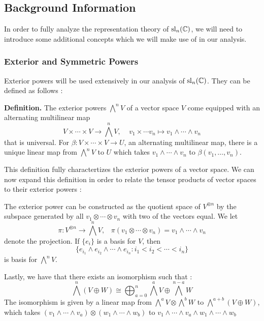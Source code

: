 \documentclass[11pt, a4paper, oneside]{article}
\theoremstyle{plain}
\theoremstyle{definition}
\theoremstyle{example}
\begin{document}
\subsection{Background Information}

In order to fully analyze the representation theory of $\mathrm{sl}_n(\mathbb{C})$, we will need to introduce some additional concepts which we will make use of in our analysis.

\subsubsection{Exterior and Symmetric Powers}

Exterior powers will be used extensively in our analysis of $\mathrm{sl}_n(\mathbb{C})$. They can be defined as follows \cite[\S B.2]{fulton}:

\par
\textbf{Definition.} The exterior powers $\bigwedge^n V$ of a vector space $V$ come equipped with an alternating multilinear map $$V \times \cdots \times V \to \bigwedge^nV, \; \; \; \; v_1 \times \cdots v_n \mapsto v_1 \wedge \cdots \wedge v_n$$ that is universal. For $\beta: V \times \cdots \times V \to U$, an alternating multilinear map, there is a unique linear map from $\bigwedge^n V$ to $U$ which takes $v_1 \wedge \cdots \wedge v_n$ to $\beta(v_1 ,\ldots, v_n)$.

\par
This definition fully charactertizes the exterior powers of a vector space. We can now expand this definition in order to relate the tensor products of vector spaces to their exterior powers \cite[\S B.2]{fulton}:

\par
The exterior power can be constructed as the quotient space of $V^{\otimes n}$ by the subspace generated by all $v_1 \otimes \cdots \otimes v_n$ with two of the vectors equal. We let $$\pi: V^{\otimes n} \to \bigwedge^n V, \; \; \; \pi(v_1 \otimes \cdots \otimes v_n) = v_1 \wedge \cdots \wedge v_n$$ denote the projection. If $\{e_i\}$ is a basis for $V$, then $$\{e_{i_1} \wedge e_{i_2} \wedge \cdots \wedge e_{i_n}: i_1 < i_2 < \cdots < i_n\}$$ is basis for $\bigwedge^n V$.

\par
Lastly, we have that there exists an isomorphism such that \cite[\S B.2]{fulton}: $$\bigwedge^n(V \oplus W) \cong \bigoplus^n_{a = 0} \bigwedge^a V \oplus \bigwedge^{n-a} W$$ The isomorphism is given by a linear map from $\bigwedge^a V \otimes \bigwedge^b W$ to $\bigwedge^{a+b}(V \oplus W)$, which takes $(v_1 \wedge \cdots \wedge v_a) \otimes (w_1 \wedge \cdots \wedge w_b)$ to $v_1 \wedge \cdots \wedge v_a \wedge w_1 \wedge \cdots \wedge w_b$
\end{document}
